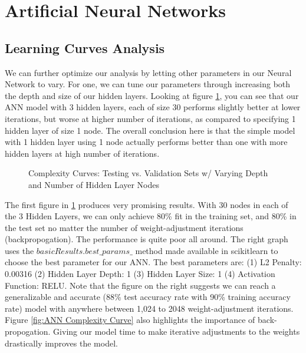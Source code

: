 \documentclass[letterpaper,12pt]{article}
\begin{document}
\section{Artificial Neural Networks}

\subsection{Learning Curves Analysis}
We can further optimize our analysis by letting other parameters in our Neural Network to vary.  For one, we can tune our parameters through increasing both the depth and size of our hidden layers.  Looking at figure \ref{fig:ANN Complexity Curves}, you can see that our ANN model with 3 hidden layers, each of size 30 performs slightly better at lower iterations, but worse at higher number of iterations, as compared to specifying 1 hidden layer of size 1 node.  The overall conclusion here is that the simple model with 1 hidden layer using 1 node actually performs better than one with more hidden layers at high number of iterations.  

\begin{figure} %
  \centering
  \hspace{8pt}%
  \caption{Complexity Curves:  Testing vs. Validation Sets w/ Varying Depth and Number of Hidden Layer Nodes}\label{fig:ANN Complexity Curves}
\end{figure}


The first figure in \ref{fig:ANN Complexity Curves} produces very promising results.  With 30 nodes in each of the 3 Hidden Layers, we can only achieve 80\% fit in the training set, and 80\% in the test set no matter the number of weight-adjustment iterations (backpropogation).  The performance is quite poor all around.  The right graph uses the $basicResults.best\_params\_$ method made available in scikitlearn to choose the best parameter for our ANN.  The best parameters are:  (1) L2 Penalty: 0.00316 (2) Hidden Layer Depth: 1 (3) Hidden Layer Size: 1 (4) Activation Function: RELU.  Note that the figure on the right suggests we can reach a generalizable and accurate (88\% test accuracy rate with 90\% training accuracy rate) model with anywhere between 1,024 to 2048 weight-adjustment iterations.  Figure \ref{fig:ANN Complexity Curve} also highlights the importance of back-propogation.  Giving our model time to make iterative adjustments to the weights drastically improves the model.   
\end{document}
